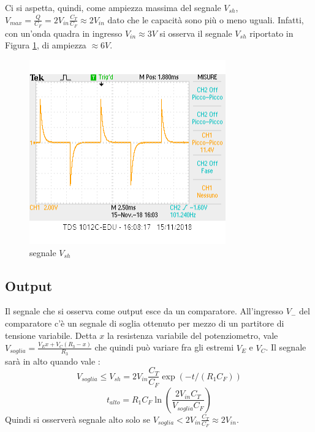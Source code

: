 \documentclass[10pt,a4paper]{article}
\begin{document}
Ci si aspetta, quindi, come ampiezza massima del segnale $V_{sh}$, $V_{max}=\frac{Q}{C_F}=2 V_{in} \frac{C_T}{C_F}\approx 2 V_{in} $ dato che le capacità sono più o meno uguali. Infatti, con un'onda quadra in ingresso $V_{in}\approx3V$ si osserva il segnale $V_{sh}$ riportato in Figura \ref{fig:sample}, di ampiezza $\approx 6V$.
		
		\begin{figure}
			\centering
			\includegraphics[scale=0.85]{sample.png}
			\caption{segnale $V_{sh}$}
			\label{fig:sample}
		\end{figure}
	\subsection{Output} \label{Output}
	
		Il segnale che si osserva come output esce da un comparatore.
		All'ingresso $V_-$ del comparatore c'è un segnale di soglia  ottenuto per mezzo di un partitore di tensione variabile. Detta $x$ la resistenza variabile del potenziometro, vale $V_{soglia}=\frac{V_E x+V_C(R_3-x)}{R_3}$ che quindi può variare fra gli estremi $V_E$  e $ V_C$.
		Il segnale sarà in alto quando vale :\[V_{soglia}\le V_{sh}=2V_{in} \frac{C_T}{C_F} \exp(-t/(R_1 C_F))\]
		\[t_{alto}=R_1 C_F \ln(\frac{2 V_{in} C_T}{V_{soglia} C_F})\] 
		Quindi si osserverà segnale alto solo se $V_{soglia} <2 V_{in} \frac{C_T}{C_F}\approx 2 V_{in} $.
\end{document}
